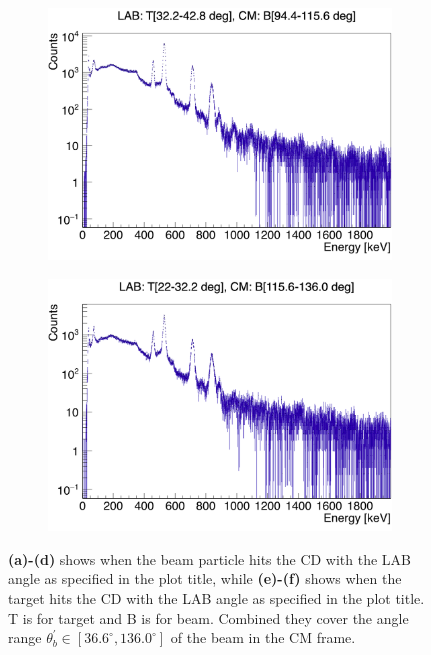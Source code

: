 \documentclass[twoside,english]{uiofysmaster/uiofysmaster}
\begin{document}
\begin{figure}[htb!]
\begin{subfigure}[t]{0.49\textwidth}
		\includegraphics[width=\textwidth]{../Plots/plotting/Projections-combined/T_dcB_x-ProjY_5-8_combined.png}
		\caption{}
	\end{subfigure}
	\hfill
	\begin{subfigure}[t]{0.49\textwidth}
		\centering
		\includegraphics[width=\textwidth]{../Plots/plotting/Projections-combined/T_dcB_x-ProjY_2-4_combined.png}
		\caption{}
	\end{subfigure}
	\caption{\textbf{(a)-(d)} shows when the beam particle hits the CD with the LAB angle as specified in the plot title, while \textbf{(e)-(f)} shows when the target hits the CD with the LAB angle as specified in the plot title. T is for target and B is for beam. Combined they cover the angle range $\theta_b^{'} \in [36.6^\circ, 136.0^\circ]$ of the beam in the CM frame.}
	\label{fig:projections}
\end{figure}
\end{document}
